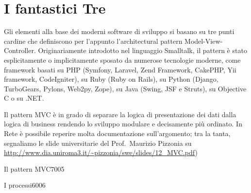 \chapter{I fantastici Tre}
\label{cap:fantastici}

Gli elementi alla base dei moderni software di sviluppo si basano su tre punti cardine che definiscono per l'appunto l'architectural pattern Model-View-Controller. Originariamente introdotto nel linguaggio Smalltalk, il pattern è stato esplicitamente o implicitamente sposato da numerose tecnologie moderne, come framework basati su PHP (Symfony, Laravel, Zend Framework, CakePHP, Yii framework, CodeIgniter), su Ruby (Ruby on Rails), su Python (Django, TurboGears, Pylons, Web2py, Zope), su Java (Swing, JSF e Struts), su Objective C o su .NET.

Il pattern MVC è in grado di separare la logica di presentazione dei dati dalla logica di business  rendendo lo sviluppo modulare e decisamente più ordinato. In Rete è possibile reperire molta documentazione sull'argomento; tra la tanta, segnaliamo le slide universitarie del Prof.~Maurizio Pizzonia  su \url{http://www.dia.uniroma3.it/~pizzonia/swe/slides/12_MVC.pdf})

\begin{img}{Il pattern MVC}{7}{005}
\end{img}

\begin{img}{I processi}{6}{006}
\end{img}